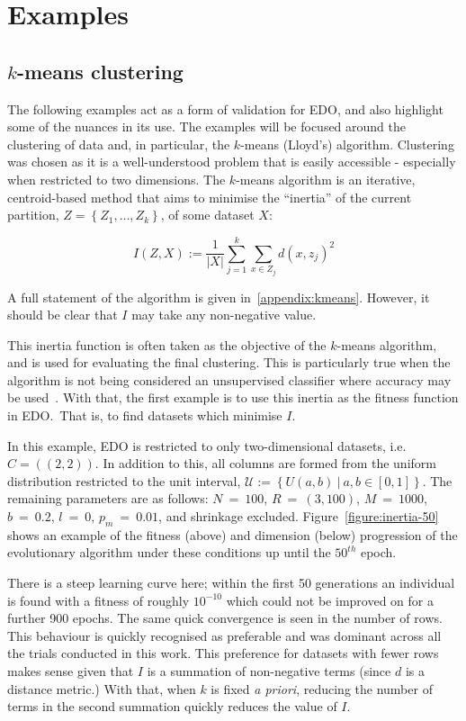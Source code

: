 \section{Examples}\label{section:examples}

\subsection{\(k\)-means clustering}

The following examples act as a form of validation for EDO, and also highlight
some of the nuances in its use. The examples will be focused around the
clustering of data and, in particular, the \(k\)-means (Lloyd's) algorithm.
Clustering was chosen as it is a well-understood problem that is easily
accessible \-- especially when restricted to two dimensions. The \(k\)-means
algorithm is an iterative, centroid-based method that aims to minimise the
``inertia'' of the current partition, \(Z = \left\{Z_1, \ldots, Z_k\right\}\),
of some dataset \(X\):

\begin{equation}
    I(Z, X) := \frac{1}{|X|} \sum_{j=1}^{k} \sum_{x \in Z_j} {d(x, z_j)}^2
\end{equation}

A full statement of the algorithm is given in~\ref{appendix:kmeans}. However, it
should be clear that \(I\) may take any non-negative value.

This inertia function is often taken as the objective of the \(k\)-means
algorithm, and is used for evaluating the final clustering. This is particularly
true when the algorithm is not being considered an unsupervised classifier where
accuracy may be used~\cite{Huang1998}. With that, the first example is to use
this inertia as the fitness function in EDO.\ That is, to find datasets which
minimise \(I\).

In this example, EDO is restricted to only two-dimensional datasets, i.e.\ \(C =
\left((2, 2)\right)\). In addition to this, all columns are formed from the
uniform distribution restricted to the unit interval, \(\mathcal{U} :=
\left\{U(a, b)~|~a, b \in [0, 1]\right\}\). The remaining parameters are as
follows: \(N~=~100\), \(R~=~(3, 100)\), \(M~=~1000\), \(b~=~0.2\), \(l~=~0\),
\(p_m~=~0.01\), and shrinkage excluded. Figure~\ref{figure:inertia-50} shows an
example of the fitness (above) and dimension (below) progression of the
evolutionary algorithm under these conditions up until the \(50^{th}\) epoch.

There is a steep learning curve here; within the first 50 generations an
individual is found with a fitness of roughly \(10^{-10}\) which could not be
improved on for a further 900 epochs. The same quick convergence is seen in the
number of rows. This behaviour is quickly recognised as preferable and was
dominant across all the trials conducted in this work. This preference for
datasets with fewer rows makes sense given that \(I\) is a summation of
non-negative terms (since \(d\) is a distance metric.) With that, when \(k\) is
fixed \textit{a priori}, reducing the number of terms in the second summation
quickly reduces the value of \(I\). 


